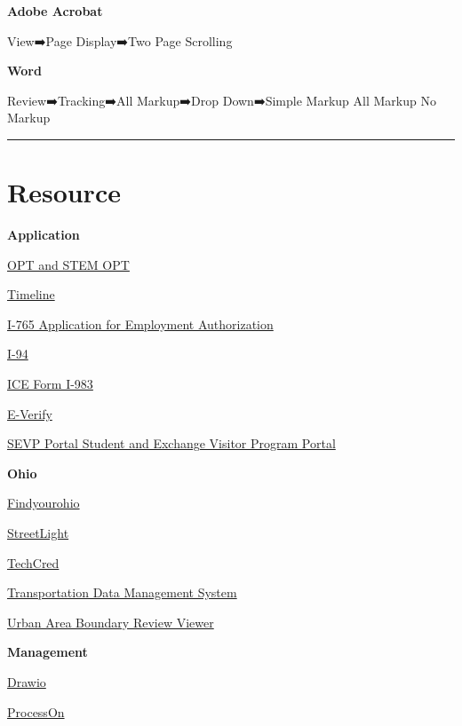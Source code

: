 \documentclass[
]{book}
\begin{document}
\textbf{Adobe Acrobat}

View➡️Page Display➡️Two Page Scrolling

\textbf{Word}

Review➡️Tracking➡️All Markup➡️Drop Down➡️Simple Markup \textbar{} All Markup \textbar{} No Markup

\begin{center}\rule{0.5\linewidth}{0.5pt}\end{center}

\hypertarget{welcome}{%
\chapter{Resource}\label{welcome}}

\textbf{Application}

\href{https://www.uscis.gov/working-in-the-united-states/students-and-exchange-visitors/optional-practical-training-opt-for-f-1-students}{OPT and STEM OPT}

\href{https://opttimeline.com/IOE?CASE_TY=EAD}{Timeline}

\href{https://www.uscis.gov/i-765}{I-765 Application for Employment Authorization}

\href{https://i94.cbp.dhs.gov/I94/\#/recent-search}{I-94}

\href{https://www.ice.gov/doclib/sevis/pdf/i983.pdf}{ICE Form I-983}

\href{https://www.e-verify.gov/about-e-verify/e-verify-data/how-to-find-participating-employers}{E-Verify}

\href{https://sevp.ice.gov/opt/\#/login}{SEVP Portal \textbar{} Student and Exchange Visitor Program Portal}

\textbf{Ohio}

\href{https://www.findyourohio.com/}{Findyourohio}

\href{https://insight.streetlightdata.com/login/?/sso_auth=skilljar?next=\%2F}{StreetLight}

\href{https://techcred.ohio.gov/}{TechCred}

\href{https://morpc.public.ms2soft.com/tcds/tsearch.asp?loc=Morpc\&mod=}{Transportation Data Management System}

\href{https://gis3.dot.state.oh.us/uab-review-readonly/}{Urban Area Boundary Review Viewer}

\textbf{Management}

\href{https://app.diagrams.net/}{Drawio}

\href{https://www.processon.io/}{ProcessOn}
\end{document}
